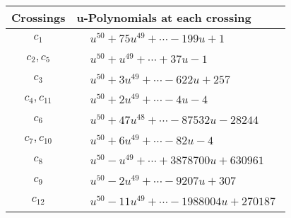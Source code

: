\documentclass[1p]{elsarticle_modified}
\theoremstyle{definition}
\begin{document}
\begin{tabular}{m{50pt}|m{274pt}}
Crossings & \hspace{64pt}u-Polynomials at each crossing \\
\hline $$\begin{aligned}c_{1}\end{aligned}$$&$\begin{aligned}
&u^{50}+75 u^{49}+\cdots-199 u+1
\end{aligned}$\\
\hline $$\begin{aligned}c_{2},c_{5}\end{aligned}$$&$\begin{aligned}
&u^{50}+u^{49}+\cdots+37 u-1
\end{aligned}$\\
\hline $$\begin{aligned}c_{3}\end{aligned}$$&$\begin{aligned}
&u^{50}+3 u^{49}+\cdots-622 u+257
\end{aligned}$\\
\hline $$\begin{aligned}c_{4},c_{11}\end{aligned}$$&$\begin{aligned}
&u^{50}+2 u^{49}+\cdots-4 u-4
\end{aligned}$\\
\hline $$\begin{aligned}c_{6}\end{aligned}$$&$\begin{aligned}
&u^{50}+47 u^{48}+\cdots-87532 u-28244
\end{aligned}$\\
\hline $$\begin{aligned}c_{7},c_{10}\end{aligned}$$&$\begin{aligned}
&u^{50}+6 u^{49}+\cdots-82 u-4
\end{aligned}$\\
\hline $$\begin{aligned}c_{8}\end{aligned}$$&$\begin{aligned}
&u^{50}- u^{49}+\cdots+3878700 u+630961
\end{aligned}$\\
\hline $$\begin{aligned}c_{9}\end{aligned}$$&$\begin{aligned}
&u^{50}-2 u^{49}+\cdots-9207 u+307
\end{aligned}$\\
\hline $$\begin{aligned}c_{12}\end{aligned}$$&$\begin{aligned}
&u^{50}-11 u^{49}+\cdots-1988004 u+270187
\end{aligned}$\\
\hline
\end{tabular}\\~\\
\end{document}
